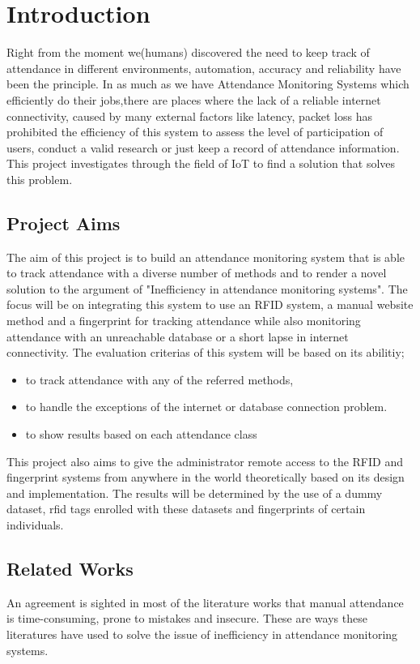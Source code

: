 \chapter{Introduction}
Right from the moment we(humans) discovered the need to keep track of attendance in different environments, automation, accuracy and reliability have been the principle. In as much as we have Attendance Monitoring Systems which efficiently do their jobs,there are places where the lack of a reliable internet connectivity, caused by many external factors like latency, packet loss has prohibited the efficiency of this system to assess the level of participation of users, conduct a valid research or just keep a record of attendance information. This project investigates through the field of IoT to find a solution that solves this problem.


\section{Project Aims}

The aim of this project is to build an attendance monitoring system that is able to track attendance with a diverse number of methods and to render a novel solution to the argument of "Inefficiency in attendance monitoring systems". The focus will be on integrating this system to use an RFID system, a manual website method and a fingerprint for tracking attendance while also monitoring attendance with an unreachable database or a short lapse in internet connectivity. The evaluation criterias of this system will be based on its abilitiy; 
\begin{itemize}
  \item to track attendance with any of the referred methods,
  \item to handle the exceptions of the internet or database connection problem.
  \item to show results based on each attendance class
\end{itemize} 
This project also aims to give the administrator remote access to the RFID and fingerprint systems from anywhere in the world theoretically based on its design and implementation. The results will be determined by the use of a dummy dataset, rfid tags enrolled with these datasets and fingerprints of certain individuals.
\section{Related Works} 
An agreement is sighted in most of the literature works that manual attendance is time-consuming, prone to mistakes and insecure. These are ways these literatures have used to solve the issue of inefficiency in attendance monitoring systems.

